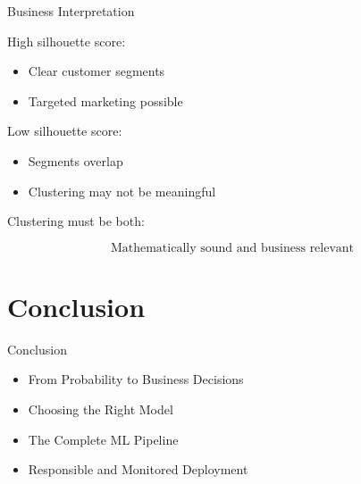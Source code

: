 \documentclass{beamer}
\begin{document}
\begin{frame}{Business Interpretation}

High silhouette score:

\begin{itemize}
    \item Clear customer segments
    \item Targeted marketing possible
\end{itemize}

\vspace{0.5cm}

Low silhouette score:

\begin{itemize}
    \item Segments overlap
    \item Clustering may not be meaningful
\end{itemize}

\vspace{0.5cm}

Clustering must be both:

\[
\text{Mathematically sound and business relevant}
\]

\end{frame}


\section{Conclusion}

\begin{frame}{Conclusion}
\begin{itemize}
    \item From Probability to Business Decisions
    \item Choosing the Right Model
    \item The Complete ML Pipeline
    \item Responsible and Monitored Deployment
\end{itemize}
\end{frame}
\end{document}
